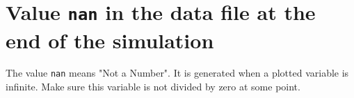 \documentclass[11pt]{book}
\def\KaSim{\textsf{KaSim}}
\def\ttt#1{\texttt{#1}}
\begin{document}

\section*{Value \ttt{nan} in the data file at the end of the simulation}
The value \ttt{nan} means "Not a Number". It is generated when a plotted variable is infinite. Make sure this variable is not divided by zero at some point.




\printindex
\end{document}

